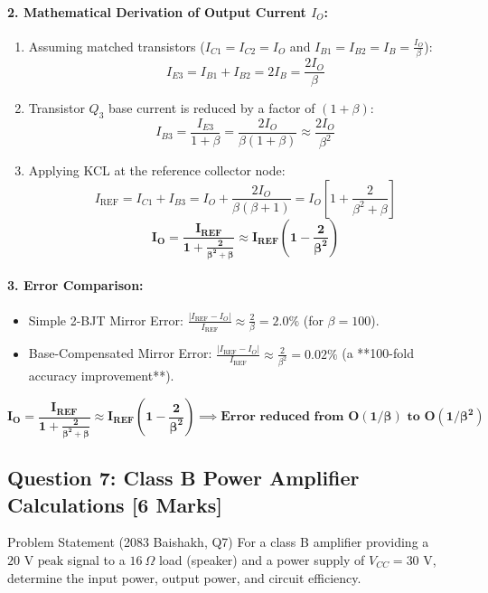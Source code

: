 \documentclass[11pt,a4paper,oneside]{book}
\begin{document}
\paragraph{2. Mathematical Derivation of Output Current $I_O$:}
\begin{enumerate}[leftmargin=1.5em]
  \item Assuming matched transistors ($I_{C1} = I_{C2} = I_O$ and $I_{B1} = I_{B2} = I_B = \frac{I_O}{\beta}$):
  \[
  I_{E3} = I_{B1} + I_{B2} = 2 I_B = \frac{2 I_O}{\beta}
  \]
  \item Transistor $Q_3$ base current is reduced by a factor of $(1+\beta)$:
  \[
  I_{B3} = \frac{I_{E3}}{1+\beta} = \frac{2 I_O}{\beta(1+\beta)} \approx \frac{2 I_O}{\beta^2}
  \]
  \item Applying KCL at the reference collector node:
  \[
  I_{\text{REF}} = I_{C1} + I_{B3} = I_O + \frac{2 I_O}{\beta(\beta + 1)} = I_O \left[1 + \frac{2}{\beta^2 + \beta}\right]
  \]
  \[
  \mathbf{I_O = \frac{I_{\text{REF}}}{1 + \frac{2}{\beta^2 + \beta}} \approx I_{\text{REF}} \left(1 - \frac{2}{\beta^2}\right)}
  \]
\end{enumerate}

\paragraph{3. Error Comparison:}
\begin{itemize}[leftmargin=1.5em]
  \item Simple 2-BJT Mirror Error: $\frac{|I_{\text{REF}} - I_O|}{I_{\text{REF}}} \approx \frac{2}{\beta} = 2.0\%$ (for $\beta = 100$).
  \item Base-Compensated Mirror Error: $\frac{|I_{\text{REF}} - I_O|}{I_{\text{REF}}} \approx \frac{2}{\beta^2} = 0.02\%$ (a **100-fold accuracy improvement**).
\end{itemize}

\begin{answerbox}
$$\mathbf{I_O = \frac{I_{\text{REF}}}{1 + \frac{2}{\beta^2 + \beta}} \approx I_{\text{REF}} \left(1 - \frac{2}{\beta^2}\right) \implies \text{Error reduced from } O(1/\beta) \text{ to } O(1/\beta^2)}$$
\end{answerbox}

\vspace{0.6cm}

\subsection{Question 7: Class B Power Amplifier Calculations [6 Marks]}
\begin{questionbox}{Problem Statement (2083 Baishakh, Q7)}
For a class B amplifier providing a $20\text{ V peak}$ signal to a $16\ \Omega$ load (speaker) and a power supply of $V_{CC} = 30\text{ V}$, determine the input power, output power, and circuit efficiency.
\end{questionbox}
\end{document}
